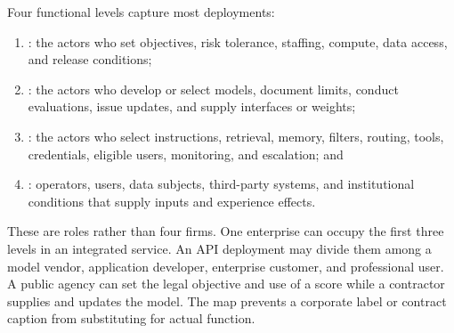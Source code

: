 Four functional levels capture most deployments:

\begin{enumerate}[leftmargin=2.2em]
\item {}: the actors who set objectives, risk tolerance, staffing, compute, data access, and release conditions;
\item {}: the actors who develop or select models, document limits, conduct evaluations, issue updates, and supply interfaces or weights;
\item {}: the actors who select instructions, retrieval, memory, filters, routing, tools, credentials, eligible users, monitoring, and escalation; and
\item {}: operators, users, data subjects, third-party systems, and institutional conditions that supply inputs and experience effects.
\end{enumerate}

These are roles rather than four firms. One enterprise can occupy the first three levels in an integrated service. An API deployment may divide them among a model vendor, application developer, enterprise customer, and professional user. A public agency can set the legal objective and use of a score while a contractor supplies and updates the model. The map prevents a corporate label or contract caption from substituting for actual function.

